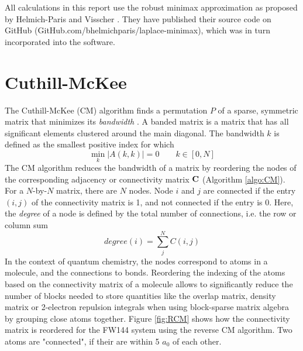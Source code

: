 All calculations in this report use the robust minimax approximation as proposed by Helmich-Paris and Visscher \cite{Hel2016}. They have published their source code on GitHub (GitHub.com/bhelmichparis/laplace-minimax), which was in turn incorporated into the \mchem{} software.

\section{Cuthill-McKee}

The Cuthill-McKee (CM) algorithm finds a permutation $P$ of a sparse, symmetric matrix that minimizes its \emph{bandwidth} \cite{Cut1969}. A banded matrix is a matrix that has all significant elements clustered around the main diagonal. The bandwidth $k$ is defined as the smallest positive index for which
\begin{equation}
\min_k \left\lvert A(k,k) \right\rvert = 0 \qquad k \in [0,N]
\end{equation}
\noindent The CM algorithm reduces the bandwidth of a matrix by reordering the nodes of the corresponding adjacency or connectivity matrix $\mathbf{C}$ (Algorithm \ref{algo:CM}). For a $N$-by-$N$ matrix, there are $N$ nodes. Node $i$ and $j$ are connected if the entry $(i,j)$ of the connectivity matrix is 1, and not connected if the entry is 0. Here, the \emph{degree} of a node is defined by the total number of connections, i.e. the row or column sum
\begin{equation}
degree(i) = \sum_j^N C(i,j)
\end{equation}
In the context of quantum chemistry, the nodes correspond to atoms in a molecule, and the connections to bonds. Reordering the indexing of the atoms based on the connectivity matrix of a molecule allows to significantly reduce the number of blocks needed to store quantities like the overlap matrix, density matrix or 2-electron repulsion integrals when using block-sparse matrix algebra by grouping close atoms together. Figure \ref{fig:RCM} shows how the connectivity matrix is reordered for the FW144 system using the reverse CM algorithm. Two atoms are "connected", if their are within 5 $a_0$ of each other.

